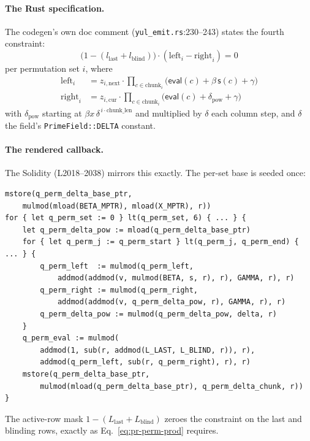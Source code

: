 \paragraph{The Rust specification.} The codegen's own doc comment
(\texttt{yul\_emit.rs}:230--243) states the fourth constraint:
\begin{equation}
\bigl(1-(l_\text{last}+l_\text{blind})\bigr)\cdot
(\text{left}_i-\text{right}_i)=0
\label{eq:pr-perm-prod}
\end{equation}
per permutation set $i$, where
\begin{align}
\text{left}_i  &= z_{i,\text{next}}\cdot
  \textstyle\prod_{c\in\text{chunk}_i}\bigl(\mathsf{eval}(c)+\beta\,\mathsf{s}(c)+\gamma\bigr) \\
\text{right}_i &= z_{i,\text{cur}}\cdot
  \textstyle\prod_{c\in\text{chunk}_i}\bigl(\mathsf{eval}(c)+\delta_{\text{pow}}+\gamma\bigr)
\end{align}
with $\delta_{\text{pow}}$ starting at
$\beta x\,\delta^{\,i\cdot\text{chunk\_len}}$ and multiplied by
$\delta$ each column step, and $\delta$ the field's
\texttt{PrimeField::DELTA} constant.

\paragraph{The rendered callback.} The Solidity (L2018--2038)
mirrors this exactly. The per-set base is seeded once:
\begin{lstlisting}[style=yul]
mstore(q_perm_delta_base_ptr,
    mulmod(mload(BETA_MPTR), mload(X_MPTR), r))
for { let q_perm_set := 0 } lt(q_perm_set, 6) { ... } {
    let q_perm_delta_pow := mload(q_perm_delta_base_ptr)
    for { let q_perm_j := q_perm_start } lt(q_perm_j, q_perm_end) { ... } {
        q_perm_left  := mulmod(q_perm_left,
            addmod(addmod(v, mulmod(BETA, s, r), r), GAMMA, r), r)
        q_perm_right := mulmod(q_perm_right,
            addmod(addmod(v, q_perm_delta_pow, r), GAMMA, r), r)
        q_perm_delta_pow := mulmod(q_perm_delta_pow, delta, r)
    }
    q_perm_eval := mulmod(
        addmod(1, sub(r, addmod(L_LAST, L_BLIND, r)), r),
        addmod(q_perm_left, sub(r, q_perm_right), r), r)
    mstore(q_perm_delta_base_ptr,
        mulmod(mload(q_perm_delta_base_ptr), q_perm_delta_chunk, r))
}
\end{lstlisting}
The active-row mask $1-(L_\text{last}+L_\text{blind})$ zeroes the
constraint on the last and blinding rows, exactly as
Eq.~\eqref{eq:pr-perm-prod} requires.

